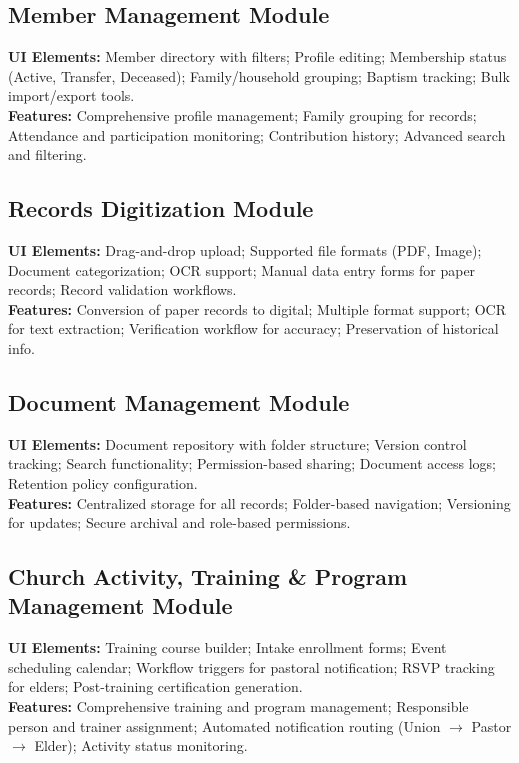 \documentclass[12pt]{report}
\begin{document}
\subsection{Member Management Module}
\textbf{UI Elements:} Member directory with filters; Profile editing; Membership status (Active, Transfer, Deceased); Family/household grouping; Baptism tracking; Bulk import/export tools. \\
\textbf{Features:} Comprehensive profile management; Family grouping for records; Attendance and participation monitoring; Contribution history; Advanced search and filtering.

\subsection{Records Digitization Module}
\textbf{UI Elements:} Drag-and-drop upload; Supported file formats (PDF, Image); Document categorization; OCR support; Manual data entry forms for paper records; Record validation workflows. \\
\textbf{Features:} Conversion of paper records to digital; Multiple format support; OCR for text extraction; Verification workflow for accuracy; Preservation of historical info.

\subsection{Document Management Module}
\textbf{UI Elements:} Document repository with folder structure; Version control tracking; Search functionality; Permission-based sharing; Document access logs; Retention policy configuration. \\
\textbf{Features:} Centralized storage for all records; Folder-based navigation; Versioning for updates; Secure archival and role-based permissions.

\subsection{Church Activity, Training \& Program Management Module}
\textbf{UI Elements:} Training course builder; Intake enrollment forms; Event scheduling calendar; Workflow triggers for pastoral notification; RSVP tracking for elders; Post-training certification generation. \\
\textbf{Features:} Comprehensive training and program management; Responsible person and trainer assignment; Automated notification routing (Union $\rightarrow$ Pastor $\rightarrow$ Elder); Activity status monitoring.
\end{document}
